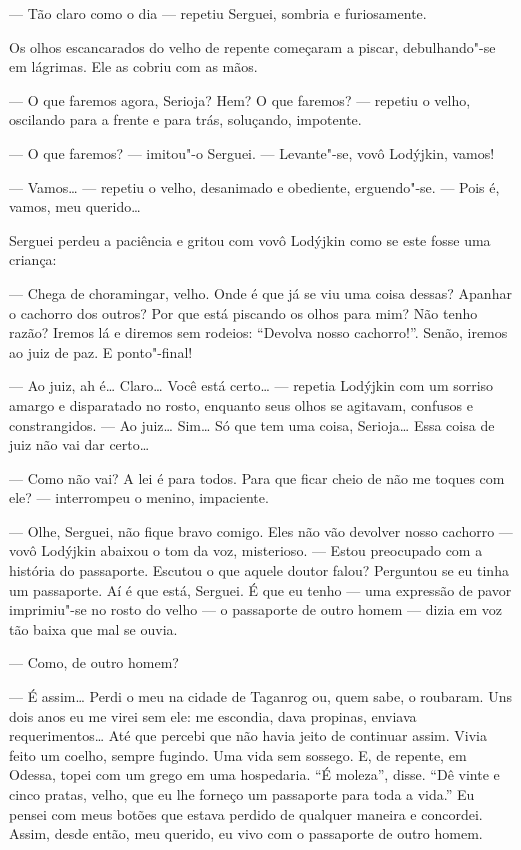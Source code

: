--- Tão claro como o dia --- repetiu Serguei, sombria e furiosamente.

Os olhos escancarados do velho de repente começaram a piscar,
debulhando"-se em lágrimas. Ele as cobriu com as mãos.

--- O que faremos agora, Serioja? Hem? O que faremos? --- repetiu o
velho, oscilando para a frente e para trás, soluçando, impotente.

--- O que faremos? --- imitou"-o Serguei. --- Levante"-se, vovô Lodýjkin,
vamos!

--- Vamos\ldots{} --- repetiu o velho, desanimado e obediente, erguendo"-se.
--- Pois é, vamos, meu querido\ldots{}

Serguei perdeu a paciência e gritou com vovô Lodýjkin como se este fosse
uma criança:

--- Chega de choramingar, velho. Onde é que já se viu uma coisa dessas?
Apanhar o cachorro dos outros? Por que está piscando os olhos para mim?
Não tenho razão? Iremos lá e diremos sem rodeios: ``Devolva nosso
cachorro!''. Senão, iremos ao juiz de paz. E ponto"-final!

--- Ao juiz, ah é\ldots{} Claro\ldots{} Você está certo\ldots{} --- repetia Lodýjkin
com um sorriso amargo e disparatado no rosto, enquanto seus olhos se
agitavam, confusos e constrangidos. --- Ao juiz\ldots{} Sim\ldots{} Só que tem uma
coisa, Serioja\ldots{} Essa coisa de juiz não vai dar certo\ldots{}

--- Como não vai? A lei é para todos. Para que ficar cheio de não me
toques com ele? --- interrompeu o menino, impaciente.

--- Olhe, Serguei, não fique bravo comigo. Eles não vão devolver nosso
cachorro --- vovô Lodýjkin abaixou o tom da voz, misterioso. --- Estou
preocupado com a história do passaporte. Escutou o que aquele doutor
falou? Perguntou se eu tinha um passaporte. Aí é que está, Serguei. É
que eu tenho --- uma expressão de pavor imprimiu"-se no rosto do velho
--- o passaporte de outro homem --- dizia em voz tão baixa que mal se
ouvia.

--- Como, de outro homem?

--- É assim\ldots{} Perdi o meu na cidade de Taganrog ou, quem sabe, o
roubaram. Uns dois anos eu me virei sem ele: me escondia, dava propinas,
enviava requerimentos\ldots{} Até que percebi que não havia jeito de
continuar assim. Vivia feito um coelho, sempre fugindo. Uma vida sem
sossego. E, de repente, em Odessa, topei com um grego em uma hospedaria.
``É moleza'', disse. ``Dê vinte e cinco pratas, velho, que eu lhe forneço
um passaporte para toda a vida.'' Eu pensei com meus botões que estava
perdido de qualquer maneira e concordei. Assim, desde então, meu
querido, eu vivo com o passaporte de outro homem.

